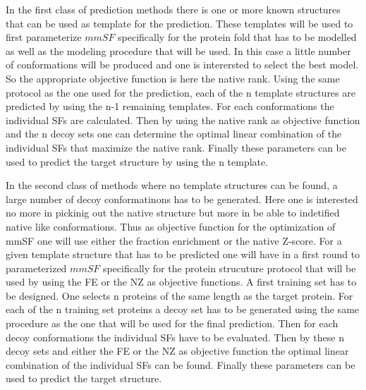 \documentclass[a4paper,20pt,notitlepage,openbib]{article}
\begin{document}
In the first class of prediction methods there is one or more known structures that can be used as template for the prediction. These templates will be used to first parameterize $mmSF$ specifically for the protein fold that has to be modelled as well as the modeling procedure that will be used. In this case a little number of conformations will be produced and one is interersted to select the best model. So the appropriate objective function is here the native rank. Using the same protocol as the one used for the prediction, each of the n template structures are predicted by using the n-1 remaining templates. For each conformations the individual SFs are calculated. Then by using the native rank as objective function and the n decoy sets one can determine the optimal linear combination of the individual SFs that maximize the native rank. Finally these parameters can be used to predict the target structure by using the n template.

In the second class of methods where no template structures can be found, a large number of decoy conformatinons has to be generated. Here one is interested no more in pickinig out the native structure but more in be able to indetified native like conformations. Thus as objective function for the optimization of mmSF one will use either the fraction enrichment or the native Z-score. For a given template structure that has to be predicted one will have in a first round to parameterized $mmSF$ specifically for the protein strucuture protocol that will be used by using the FE or the NZ as objective functions. A first training set has to be designed. One  selects n proteins of the same length as the target protein. For each of the n training set proteins a decoy set has to be generated using the same procedure as the one that will be used for the final prediction. Then for each decoy conformations the individual SFs have to be evaluated. Then by these n decoy sets and either the FE or the NZ as objective function the optimal linear combination of the individual SFs can be found. Finally these parameters can be used to predict the target structure.
\end{document}
